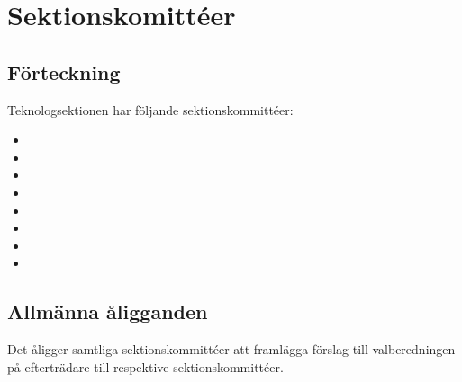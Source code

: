\section{Sektionskomittéer}

\subsection{Förteckning}
Teknologsektionen har följande sektionskommittéer:

\begin{itemize}
	\item \SEXITFULL
	\item \NOLLKITFULL
	\item \PRITFULL
	\item \FRITIDFULL
	\item \ARMITFULL
	\item \DIGITFULL
	\item \FANBARERITFULL
	\item \MRCITFULL
\end{itemize}

\subsection{Allmänna åligganden}
Det åligger samtliga sektionskommittéer att framlägga förslag till valberedningen på efterträdare till respektive sektionskommittéer. 

\newpage

\newpage

\newpage

\newpage

\newpage

\newpage

\newpage

\newpage
